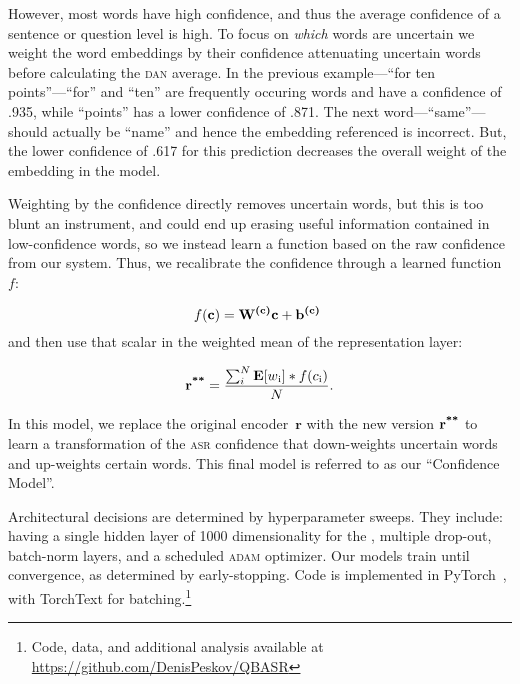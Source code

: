 However, most words have high confidence, and thus the average confidence of a sentence or question level is high.  
%
To focus on \emph{which} words
are uncertain we weight the word embeddings by their confidence attenuating uncertain words before calculating the \textsc{dan} average.
%
In the previous example---``for ten points''---``for'' and ``ten'' are frequently occuring words and have a confidence of .935, while ``points'' has a lower confidence of .871. 
%
 The next word---``same''---should actually be ``name'' and hence the embedding referenced is incorrect.
But, the lower confidence of .617 for this prediction decreases the overall weight of the embedding in the model.  





Weighting by the confidence directly removes uncertain words, but this
is too blunt an instrument, and could end up erasing useful information contained in low-confidence words, so we instead learn a function based
on the raw confidence from our  system.  Thus, we recalibrate
the confidence through a learned function~$f$:

\begin{equation}
f(\textbf{c}) = \textbf{W\textsuperscript{(c)}c} + \textbf{b\textsuperscript{(c)} }
\end{equation}
and then use that scalar in the weighted mean of the 
representation layer:

\begin{equation}
\textbf{r\textsuperscript{**}} = \frac{\sum_{i}^{N} \textbf{E}[w\textsubscript{i}] * f(c\textsubscript{i})}{N}.
\end{equation}

In this model, we replace the original encoder~$\textbf{r}$ with the
new version $\textbf{r\textsuperscript{**}}$ to learn a transformation
of the \textsc{asr} confidence that down-weights uncertain words and
up-weights certain words.  This final model is referred to as our ``Confidence Model''.

Architectural decisions are determined by hyperparameter sweeps.  They include: having a single hidden layer of 1000 dimensionality for the \dan, multiple drop-out, batch-norm layers, and a scheduled \textsc{adam} optimizer. Our \dan{} models train until convergence, as determined by early-stopping.  Code is
implemented in PyTorch~\citep{paszke2017automatic}, with TorchText for
batching.\footnote{Code, data, and additional analysis available at \url{https://github.com/DenisPeskov/QBASR}}
